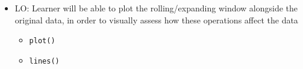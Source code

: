 \documentclass[
]{book}
\providecommand{\tightlist}{%
  \setlength{\itemsep}{0pt}\setlength{\parskip}{0pt}}
\begin{document}
\begin{itemize}
  \begin{itemize}
  \tightlist
  \item
    LO: Learner will be able to plot the rolling/expanding window alongside the original data, in order to visually assess how these operations affect the data

    \begin{itemize}
    \tightlist
    \item
      \texttt{plot()}
    \item
      \texttt{lines()}
    \end{itemize}
  \end{itemize}
\end{itemize}

  
\end{document}

